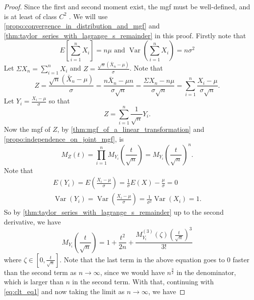 \documentclass[notoc,notitlepage]{tufte-book}
\DeclareMathOperator{\Var}{Var }
\begin{document}
\begin{proof}
  Since the first and second moment exist, the mgf must be well-defined, and is at least of class $C^2$ . We will use \cref{propo:convergence_in_distribution_and_mgf} and\\ \noindent \cref{thm:taylor_series_with_lagrange_s_remainder} in this proof. Firstly note that
  \begin{equation*}
    E\left[ \sum_{i=1}^{n} X_i \right] = n \mu \text{ and } \Var\left( \sum_{i=1}^{n} X_i \right) = n \sigma^2
  \end{equation*}
  Let $\Sigma X_n = \sum_{i=1}^{n} X_i$ and $Z = \frac{\sqrt{n} ( \bar{X}_n - \mu )}{\sigma}$. Note that
  \begin{equation*}
    Z = \frac{\sqrt{n} ( \bar{X}_n - \mu )}{\sigma} = \frac{n \bar{X}_n - \mu n}{\sigma \sqrt{n}} = \frac{\Sigma X_n - n \mu}{\sigma \sqrt{n}} = \sum_{i=1}^{n} \frac{X_i - \mu}{\sigma \sqrt{n}}.
  \end{equation*}
  Let $Y_i = \frac{X_i - \mu}{\sigma}$ so that
  \begin{equation*}
    Z = \sum^{n}_{i=1} \frac{1}{\sqrt{n}} Y_i.
  \end{equation*}
  Now the mgf of $Z$, by \cref{thm:mgf_of_a_linear_transformation} and \cref{propo:independence_on_joint_mgf}, is
  \begin{equation}\label{eq:clt_eq1}
    M_Z(t) = \prod_{i=1}^{n} M_{Y_i}\left(\frac{t}{\sqrt{n}}\right) = M_{Y_i}\left(\frac{t}{\sqrt{n}}\right)^n.
  \end{equation}
  Note that
  \begin{gather*}
    E(Y_i) = E\left( \frac{X_i - \mu}{\sigma} \right) = \frac{1}{\sigma} E(X) - \frac{\mu}{\sigma} = 0 \\
    \Var(Y_i) = \Var\left( \frac{X_i - \mu}{\sigma} \right) = \frac{1}{\sigma^2} \Var(X_i) = 1.
  \end{gather*}
  So by \cref{thm:taylor_series_with_lagrange_s_remainder} up to the second derivative, we have
  \begin{equation*}
    M_{Y_i}\left(\frac{t}{\sqrt{n}}\right) = 1 + \frac{t^2}{2n} + \frac{M_{Y_i}^{(3)} ( \zeta ) \left( \frac{t}{\sqrt{n}} \right)^3}{3!}
  \end{equation*}
  where $\zeta \in \left[0, \frac{t}{\sqrt{n}}\right]$. Note that the last term in the above equation goes to $0$ faster than the second term as $n \to \infty$, since we would have $n^{\frac{3}{2}}$ in the denominator, which is larger than $n$ in the second term. With that, continuing with \cref{eq:clt_eq1} and now taking the limit as $n \to \infty$, we have

\end{proof}
\end{document}

